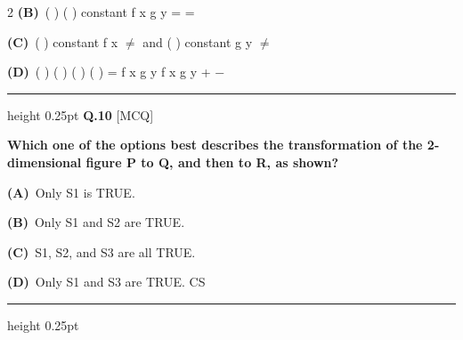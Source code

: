 \documentclass[a4paper,10pt,twoside]{article}
\begin{document}
\begin{multicols}{2}
\textbf{(B)}~( ) \newline ( ) \newline constant \newline f x \newline g y \newline = \newline =\par\vspace{2pt}\noindent
\textbf{(C)}~( ) \newline constant \newline f x $\ne$ \newline and ( ) \newline constant \newline g y $\ne$\par\vspace{2pt}\noindent
\textbf{(D)}~( ) \newline ( ) \newline ( ) \newline ( ) \newline = \newline  \newline f x \newline g y \newline f x \newline g y \newline + \newline −
\par\vspace{6pt}\hrule height 0.25pt\vspace{6pt}
\noindent\textbf{Q.10} \hfill {\footnotesize\textsf{[MCQ]}}
\par\vspace{2pt}
{\bfseries Which one of the options best describes the transformation of the 2-dimensional
figure P to Q, and then to R, as shown? \par}
\par\vspace{2pt}\noindent
\textbf{(A)}~Only S1 is TRUE.\par\vspace{2pt}\noindent
\textbf{(B)}~Only S1 and S2 are TRUE.\par\vspace{2pt}\noindent
\textbf{(C)}~S1, S2, and S3 are all TRUE.\par\vspace{2pt}\noindent
\textbf{(D)}~Only S1 and S3 are TRUE. \newline CS
\par\vspace{6pt}\hrule height 0.25pt\vspace{6pt}


\end{multicols}
\end{document}
